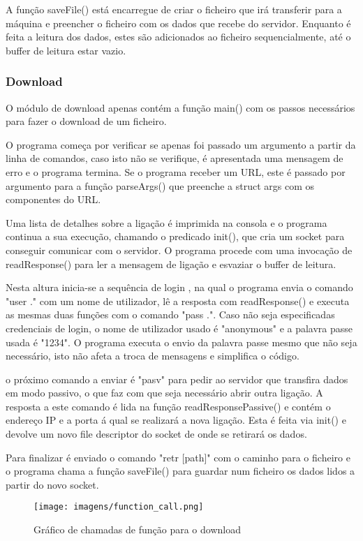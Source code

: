 A função saveFile() está encarregue de criar o ficheiro que irá transferir para a máquina e preencher o ficheiro com os dados que recebe do servidor. Enquanto é feita a leitura dos dados, estes são adicionados ao ficheiro sequencialmente, até o buffer de leitura estar vazio.
\subsubsection{Download}
O módulo de download apenas contém a função main() com os passos necessários para fazer o download de um ficheiro.

O programa começa por verificar se apenas foi passado um argumento a partir da linha de comandos, caso isto não se verifique, é apresentada uma mensagem de erro e o programa termina. Se o programa receber um URL, este é passado por argumento para a função parseArgs() que preenche a struct args com os componentes do URL.

Uma lista de detalhes sobre a ligação é imprimida na consola e o programa continua a sua execução, chamando o predicado init(), que cria um socket para conseguir comunicar com o servidor. O programa procede com uma invocação de readResponse() para ler a mensagem de ligação e esvaziar o buffer de leitura.

Nesta altura inicia-se a sequência de login \cite{ftp_rfc}, na qual o programa envia o comando "user ." com um nome de utilizador, lê a resposta com readResponse() e executa as mesmas duas funções com o comando "pass .".
Caso não seja especificadas credenciais de login, o nome de utilizador usado é "anonymous" e a palavra passe usada é "1234". O programa executa o envio da palavra passe mesmo que não seja necessário, isto não afeta a troca de mensagens e simplifica o código.

o próximo comando a enviar é "pasv" para pedir ao servidor que transfira dados em modo passivo, o que faz com que seja necessário abrir outra ligação. A resposta a este comando é lida na função readResponsePassive() e contém o endereço IP e a porta á qual se realizará a nova ligação. Esta é feita via init() e devolve um novo file descriptor do socket de onde se retirará os dados.

Para finalizar é enviado o comando "retr [path]" com o caminho para o ficheiro e o programa chama a função saveFile() para guardar num ficheiro os dados lidos a partir do novo socket.

\begin{figure}[h]
    \centering
    \texttt{[image: imagens/function\_call.png]}
    \caption{Gráfico de chamadas de função para o download}
    \label{fig:callgraph}
\end{figure}